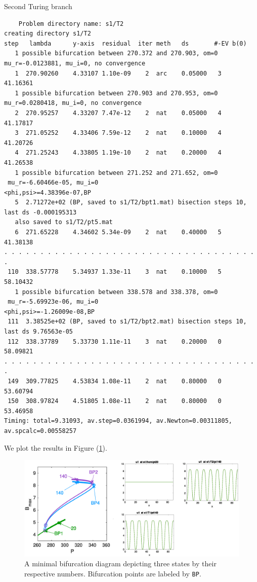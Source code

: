 \documentclass[a4paper,12pt]{article}
\begin{document}
Second Turing branch
\begin{verbatim}
    Problem directory name: s1/T2
creating directory s1/T2
step   lambda      y-axis  residual  iter meth   ds       #-EV b(0)       
   1 possible bifurcation between 270.372 and 270.903, om=0
mu_r=-0.0123881, mu_i=0, no convergence
   1  270.90260    4.33107 1.10e-09    2  arc    0.05000   3   41.16361 
   1 possible bifurcation between 270.903 and 270.953, om=0
mu_r=0.0280418, mu_i=0, no convergence
   2  270.95257    4.33207 7.47e-12    2  nat    0.05000   4   41.17817 
   3  271.05252    4.33406 7.59e-12    2  nat    0.10000   4   41.20726 
   4  271.25243    4.33805 1.19e-10    2  nat    0.20000   4   41.26538 
   1 possible bifurcation between 271.252 and 271.652, om=0
 mu_r=-6.60466e-05, mu_i=0 
<phi,psi>=4.38396e-07,BP
   5  2.71272e+02 (BP, saved to s1/T2/bpt1.mat) bisection steps 10, last ds -0.000195313
   also saved to s1/T2/pt5.mat
   6  271.65228    4.34602 5.34e-09    2  nat    0.40000   5   41.38138 
. . . . . . . . . . . . . . . . . . . . . . . . . . . . . . . . . . . . 
 110  338.57778    5.34937 1.33e-11    3  nat    0.10000   5   58.10432 
   1 possible bifurcation between 338.578 and 338.378, om=0
 mu_r=-5.69923e-06, mu_i=0 
<phi,psi>=-1.26009e-08,BP
 111  3.38525e+02 (BP, saved to s1/T2/bpt2.mat) bisection steps 10, last ds 9.76563e-05
 112  338.37789    5.33730 1.11e-11    3  nat    0.20000   0   58.09821 
. . . . . . . . . . . . . . . . . . . . . . . . . . . . . . . . . . . . 
 149  309.77825    4.53834 1.08e-11    2  nat    0.80000   0   53.60794 
 150  308.97824    4.51805 1.08e-11    2  nat    0.80000   0   53.46958 
Timing: total=9.31093, av.step=0.0361994, av.Newton=0.00311805, av.spcalc=0.00558257
\end{verbatim}
We plot the results in Figure (\ref{fig:min_bif_ss}).
\begin{figure}
    \centering
    \includegraphics[width=1\linewidth]{min_bif_ss.eps}
    \caption{A minimal bifurcation diagram depicting three states by their respective numbers. Bifurcation points are labeled by {\tt BP}.}
    \label{fig:min_bif_ss}
\end{figure}
\end{document}
